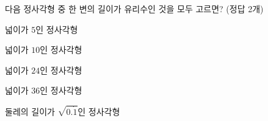 다음 정사각형 중 한 변의 길이가 유리수인 것을 모두 고르면? (정답 2개)
\begin{choicesv}{\rule[-3ex]{0pt}{8ex}넓이가 $5$인 정사각형}{\rule[-3ex]{0pt}{8ex}넓이가 $10$인 정사각형}{\rule[-3ex]{0pt}{8ex}넓이가 $24$인 정사각형}{\rule[-3ex]{0pt}{8ex}넓이가 $36$인 정사각형}{\rule[-3ex]{0pt}{8ex}둘레의 길이가 $\sqrt{0.\dot{1}}$인 정사각형}\end{choicesv}

